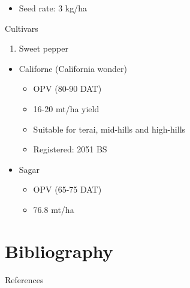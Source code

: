 \documentclass[
  ignorenonframetext,
  aspectratio=169]{beamer}
\providecommand{\tightlist}{%
  \setlength{\itemsep}{0pt}\setlength{\parskip}{0pt}}
\begin{document}
\begin{frame}{}
\protect\hypertarget{section-13}{}
\begin{itemize}
\tightlist
\item
  Seed rate: 3 kg/ha
\end{itemize}
\end{frame}

\begin{frame}{Cultivars}
\protect\hypertarget{cultivars}{}
\begin{enumerate}
\tightlist
\item
  Sweet pepper
\end{enumerate}

\begin{itemize}
\tightlist
\item
  Californe (California wonder)

  \begin{itemize}
  \tightlist
  \item
    OPV (80-90 DAT)
  \item
    16-20 mt/ha yield
  \item
    Suitable for terai, mid-hills and high-hills
  \item
    Registered: 2051 BS
  \end{itemize}
\item
  Sagar

  \begin{itemize}
  \tightlist
  \item
    OPV (65-75 DAT)
  \item
    76.8 mt/ha
  \end{itemize}
\end{itemize}
\end{frame}

\hypertarget{bibliography}{%
\section{Bibliography}\label{bibliography}}

\begin{frame}{References}
\protect\hypertarget{references}{}
\end{frame}
\end{document}
